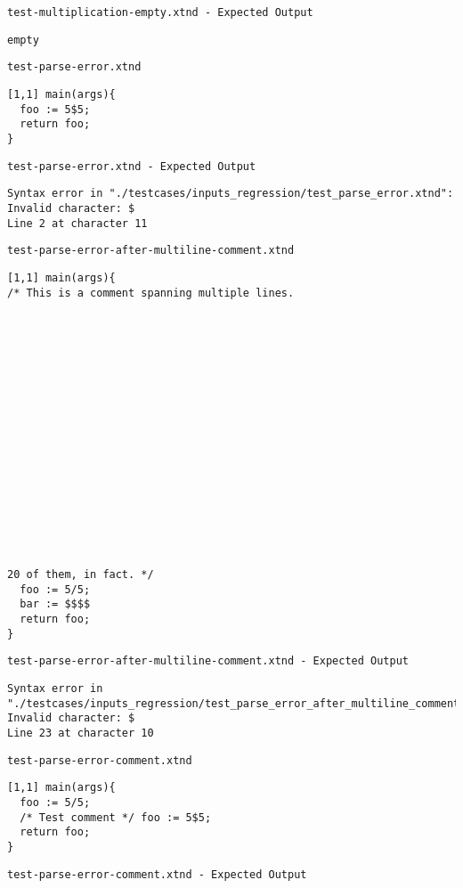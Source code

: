 \medskip \noindent \texttt{test-multiplication-empty.xtnd - Expected Output}


\begin{lstlisting}
empty
\end{lstlisting}


\medskip \noindent \texttt{test-parse-error.xtnd}


\begin{lstlisting}
[1,1] main(args){
  foo := 5$5;
  return foo;
}
\end{lstlisting}


\medskip \noindent \texttt{test-parse-error.xtnd - Expected Output}


\begin{lstlisting}
Syntax error in "./testcases/inputs_regression/test_parse_error.xtnd": Invalid character: $
Line 2 at character 11
\end{lstlisting}


\medskip \noindent \texttt{test-parse-error-after-multiline-comment.xtnd}


\begin{lstlisting}
[1,1] main(args){
/* This is a comment spanning multiple lines.


















20 of them, in fact. */
  foo := 5/5;
  bar := $$$$
  return foo;
}
\end{lstlisting}


\medskip \noindent \texttt{test-parse-error-after-multiline-comment.xtnd - Expected Output}


\begin{lstlisting}
Syntax error in "./testcases/inputs_regression/test_parse_error_after_multiline_comment.xtnd": Invalid character: $
Line 23 at character 10
\end{lstlisting}


\medskip \noindent \texttt{test-parse-error-comment.xtnd}


\begin{lstlisting}
[1,1] main(args){
  foo := 5/5;
  /* Test comment */ foo := 5$5;
  return foo;
}
\end{lstlisting}


\medskip \noindent \texttt{test-parse-error-comment.xtnd - Expected Output}


